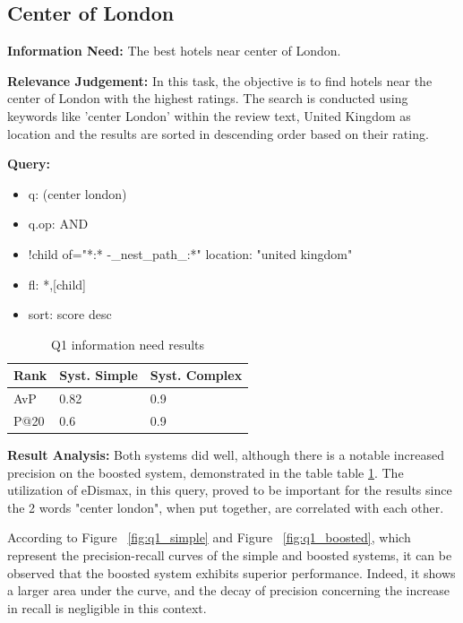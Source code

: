 \documentclass[sigconf]{acmart}
\begin{document}
\renewcommand{\thesubsection}{\Alph{subsection}}

\subsection{Center of London}



\textbf{Information Need:} The best hotels near center of London.

\textbf{Relevance Judgement:} In this task, the objective is to find hotels near the center of London with the highest ratings. The search is conducted using keywords like 'center London' within the review text, United Kingdom as location and the results are sorted in descending order based on their rating.

\textbf{Query:}

\begin{itemize}
    \item q: (center london)
    \item q.op: AND
    \item {!child of="*:* -\_nest\_path\_:*"} location: "united kingdom"
    \item fl: *,[child]
    \item sort: score desc
\end{itemize}

\begin{table}[h]
\caption{Q1 information need results}
\label{tab:q1}
\begin{tabular}{lll}
\toprule
Rank & Syst. Simple & Syst. Complex\\
\midrule
AvP & 0.82 & 0.9  \\
P@20 & 0.6 & 0.9 \\
\bottomrule
\end{tabular}
\end{table}

\textbf{Result Analysis:} Both systems did well, although there is a notable increased precision on the boosted system, demonstrated in the table table \ref{tab:q1}. The utilization of eDismax, in this query, proved to be important for the results since the 2 words "center london", when put together, are correlated with each other.

According to Figure ~\ref{fig:q1_simple} and Figure ~\ref{fig:q1_boosted}, which represent the precision-recall curves of the simple and boosted systems, it can be observed that the boosted system exhibits superior performance. Indeed, it shows a larger area under the curve, and the decay of precision concerning the increase in recall is negligible in this context.
\end{document}
